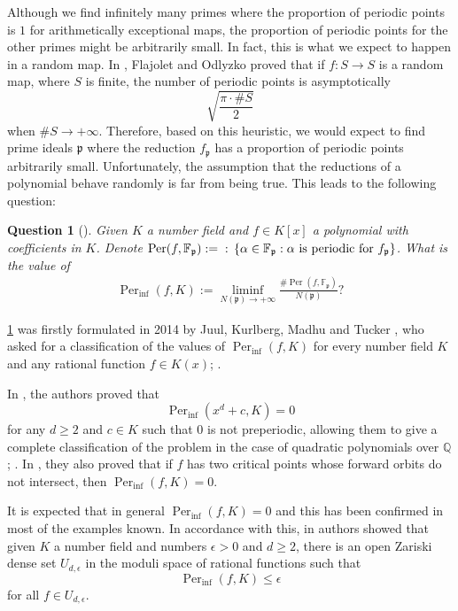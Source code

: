 \documentclass{amsart}
\def\set#1{{\def\st{\;:\;}\left\{#1\right\}}}
\def\QQ{\mathbb Q}
\def\FF{\mathbb F}
\DeclareMathOperator{\Per}{Per}
\DeclareMathOperator{\st}{st}
\newtheorem{Question}[proposition]{Question}
\theoremstyle{definition}
\begin{document}
Although we find infinitely many primes where the proportion of periodic points is $1$ for arithmetically exceptional maps, the proportion of periodic points for the other primes might be arbitrarily small. In fact, this is what we expect to happen in a random map. In \cite{FlajoletOdlyzko1990}, Flajolet and Odlyzko proved that if $f: S \rightarrow S$ is a random map, where $S$ is finite, the number of periodic points is asymptotically $$\sqrt{\frac{\pi \cdot \# S}{2}}$$ when $\# S \rightarrow +\infty$. Therefore, based on this heuristic, we would expect to find prime ideals $\mathfrak{p}$ where the reduction $f_\mathfrak{p}$ has a proportion of periodic points arbitrarily small. Unfortunately, the assumption that the reductions of a polynomial behave randomly is far from being true. This leads to the following question:

\begin{Question}[{\cite[Question 1.4]{Juul2014}}]
\label{question: proportion of periodic in reduction of maps}
Given $K$ a number field and $f \in K[x]$ a polynomial with coefficients in $K$. Denote $\Per(f,\FF_\mathfrak{p}) := \set{\alpha \in \FF_\mathfrak{p}: \alpha \text{ is periodic for } f_\mathfrak{p}}$. What is the value of 
\begin{align*}
\Per_{\inf}(f,K) := \liminf_{N(\mathfrak{p}) \rightarrow +\infty} \frac{\# \Per(f,\FF_\mathfrak{p})}{N(\mathfrak{p})}?
\end{align*}
\end{Question}



\cref{question: proportion of periodic in reduction of maps} was firstly formulated in 2014 by Juul, Kurlberg, Madhu and Tucker \cite{Juul2014}, who asked for a classification of the values of $\Per_{\inf}(f,K)$ for every number field $K$ and any rational function $f \in K(x)$; \cite[Question 1.4]{Juul2014}. 

In \cite{Juul2014}, the authors proved that $$\Per_{\inf}(x^d+c,K) = 0$$ for any $d \geq 2$ and $c \in K$ such that $0$ is not preperiodic, allowing them to give a complete classification of the problem in the case of quadratic polynomials over $\QQ$; \cite[Theorem 1.5]{Juul2014}. In \cite[Theorem 1.3]{Juul2014}, they also proved that if $f$ has two critical points whose forward orbits do not intersect, then $\Per_{\inf}(f,K) = 0$. 

It is expected that in general $\Per_{\inf}(f,K) = 0$ and this has been confirmed in most of the examples known. In accordance with this, in \cite[Theorem 1.2]{Juul2014} authors showed that given $K$ a number field and numbers $\epsilon > 0$ and $d \geq 2$, there is an open Zariski dense set $U_{d,\epsilon}$ in the moduli space of rational functions such that $$\Per_{\inf}(f,K) \leq \epsilon$$ for all $f \in U_{d,\epsilon}$. 
\end{document}
